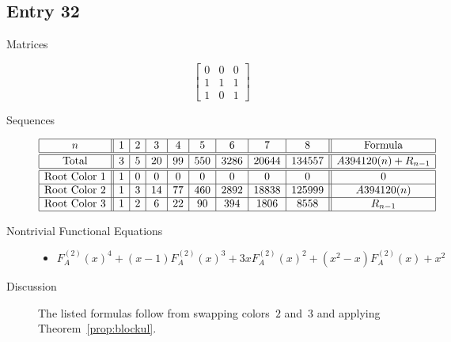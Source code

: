 \documentclass[12pt]{amsart}
\newcommand{\gff}[2]{F_{#2}^{(#1)}(x)}
\newcommand{\gfa}[1]{\gff{#1}{A}}
\begin{document}
\subsection*{Entry 32}
\begin{description}
    \item[Matrices]
    
    \[\begin{bmatrix}
0 & 0 & 0 \\
1 & 1 & 1 \\
1 & 0 & 1
\end{bmatrix}\]
    \item[Sequences]\hspace*{\fill}\vspace{-0.5cm}
    \begin{center}
        \[
        \begin{array}{|c||c|c|c|c|c|c|c|c||c|}\hline
           n  & 1 & 2 & 3 & 4 & 5 & 6 & 7 & 8  & \text{Formula}\\\hline\hline
           \text{Total}  & 3 & 5 & 20 & 99 & 550 & 3286 & 20644 & 134557 & A394120(n)+R_{n-1}\\\hline\hline
           \text{Root Color }1 & 1 & 0 & 0 & 0 & 0 & 0 & 0 & 0 & 0\\\hline
           \text{Root Color }2 & 1 & 3 & 14 & 77 & 460 & 2892 & 18838 & 125999 & A394120(n) \\\hline
           \text{Root Color }3 & 1 & 2 & 6 & 22 & 90 & 394 & 1806 & 8558 & R_{n-1}\\\hline
        \end{array}
        \]
    \end{center}
    
    \item[Nontrivial Functional Equations]\hspace*{\fill}

    \begin{itemize}
\item $\gfa{2}^4+(x - 1)\gfa{2}^3+3x\gfa{2}^2+(x^2 - x)\gfa{2}+x^2$




\end{itemize}
    \item[Discussion] The listed formulas follow from swapping colors~$2$ and~$3$ and applying Theorem~\ref{prop:blockul}.
    
\end{description}
\end{document}
